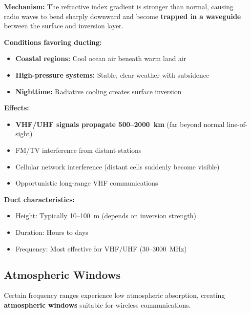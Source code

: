 \textbf{Mechanism:} The refractive index gradient is stronger than normal, causing radio waves to bend sharply downward and become \textbf{trapped in a waveguide} between the surface and inversion layer.

\textbf{Conditions favoring ducting:}
\begin{itemize}
\item \textbf{Coastal regions:} Cool ocean air beneath warm land air
\item \textbf{High-pressure systems:} Stable, clear weather with subsidence
\item \textbf{Nighttime:} Radiative cooling creates surface inversion
\end{itemize}

\textbf{Effects:}
\begin{itemize}
\item \textbf{VHF/UHF signals propagate 500--2000~km} (far beyond normal line-of-sight)
\item FM/TV interference from distant stations
\item Cellular network interference (distant cells suddenly become visible)
\item Opportunistic long-range VHF communications
\end{itemize}

\textbf{Duct characteristics:}
\begin{itemize}
\item Height: Typically 10--100~m (depends on inversion strength)
\item Duration: Hours to days
\item Frequency: Most effective for VHF/UHF (30--3000~MHz)
\end{itemize}



\subsection{Atmospheric Windows}

Certain frequency ranges experience low atmospheric absorption, creating \textbf{atmospheric windows} suitable for wireless communications.

